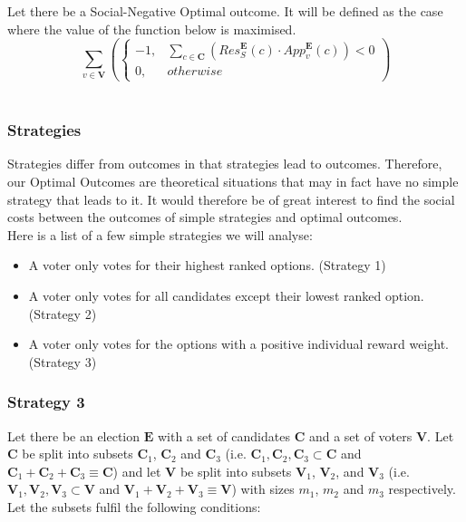 \documentclass{article}
\begin{document}
Let there be a Social-Negative Optimal outcome. It will be defined as the case where the value of the function below is maximised.
\begin{equation}
\sum^{}_{v \in \pmb{V}}{\left(
\begin{cases}
-1, & \sum^{}_{c \in \pmb{C}}{(Res^{\pmb{E}}_{S}(c) \cdot App^{\pmb{E}}_{v}(c))} < 0\\
0, & {otherwise}
\end{cases}
\right)}
\end{equation}\\

\subsubsection{Strategies}

Strategies differ from outcomes in that strategies lead to outcomes. Therefore, our Optimal Outcomes are theoretical situations that may in fact have no simple strategy that leads to it. It would therefore be of great interest to find the social costs between the outcomes of simple strategies and optimal outcomes.\\

\noindent Here is a list of a few simple strategies we will analyse:
\begin{itemize}
  \item A voter only votes for their highest ranked options. (Strategy 1)
  \item A voter only votes for all candidates except their lowest ranked option. (Strategy 2)
  \item A voter only votes for the options with a positive individual reward weight. (Strategy 3)
\end{itemize}

\subsubsection{Strategy 3}

Let there be an election $\pmb{E}$ with a set of candidates $\pmb{C}$ and a set of voters $\pmb{V}$. 
Let $\pmb{C}$ be split into subsets $\pmb{C}_{1}$, $\pmb{C}_{2}$ and $\pmb{C}_{3}$ (i.e. $\pmb{C}_{1}, \pmb{C}_{2}, \pmb{C}_{3} \subset \pmb{C}$ and $\pmb{C}_{1}+\pmb{C}_{2}+\pmb{C}_{3} \equiv \pmb{C}$) and let $\pmb{V}$ be split into subsets $\pmb{V}_{1}$, $\pmb{V}_{2}$, and $\pmb{V}_{3}$ (i.e. $\pmb{V}_{1}, \pmb{V}_{2}, \pmb{V}_{3} \subset \pmb{V}$ and $\pmb{V}_{1}+\pmb{V}_{2}+\pmb{V}_{3} \equiv \pmb{V}$) with sizes ${m}_{1}$, ${m}_{2}$ and ${m}_{3}$ respectively.
Let the subsets fulfil the following conditions:\\
\end{document}
